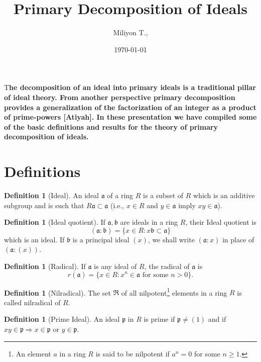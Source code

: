 \documentclass[	DIV=calc,paper=a4,fontsize=11pt]{scrartcl}	 					%
\title{Primary Decomposition of Ideals}					%
\author{Miliyon T., }											%
\date{\today}																				%
\theoremstyle{definition}
\newtheorem{defn}[thm]{Definition}
\theoremstyle{plain}
\theoremstyle{remark}
\newcommand{\initial}[1]{%
     \lettrine[lines=3,lhang=0.3,nindent=0em]{
     				\color{DarkGoldenrod}
     				{\textsf{#1}}}{}}
\begin{document}
\maketitle
\thispagestyle{fancy} 			%
\initial{T}\textbf{he decomposition of an ideal into primary ideals is a traditional pillar of ideal theory. From another perspective primary decomposition provides a generalization of the factorization of an integer as a product of prime-powers [Atiyah]. In these presentation we have compiled some of the basic definitions and results for the theory of primary decomposition of ideals.}

\section{Definitions}
\begin{defn}[Ideal]
An ideal $\mathfrak{a}$ of a ring $R$ is a subset of $R$ which is an additive subgroup and is such that $R\mathfrak{a} \subset \mathfrak{a}$ (i.e., $x\in R$ and $y\in \mathfrak{a}$ imply $xy\in \mathfrak{a}$).
\end{defn}
\begin{defn}[Ideal quotient]
If $\mathfrak{a}, \mathfrak{b}$ are ideals in a ring $R$, their Ideal quotient is
\[(\mathfrak{a}:\mathfrak{b}) = \{x\in R:x\mathfrak{b}\subset \mathfrak{a}\}\]
which is an ideal. If $\mathfrak{b}$ is a principal ideal $(x)$, we shall write $(\mathfrak{a} : x)$ in place of $(\mathfrak{a}:(x))$.
\end{defn}

\begin{defn}[Radical]
If $\mathfrak{a}$ is any ideal of $R$, the radical of $\mathfrak{a}$ is
\[r(\mathfrak{a}) = \{x\in R :x^n\in \mathfrak{a} \text{ for some } n>0\}.\]
\end{defn}

\begin{defn}[Nilradical]
The set $\mathfrak{R}$ of all nilpotent\footnote{An element $a$ in a ring $R$ is said to be nilpotent if $a^n=0$ for some $n\ge1$.} elements in a ring $R$ is called nilradical of $R$.
\end{defn}

\begin{defn}[Prime Ideal]
An ideal $\mathfrak{p}$ in $R$ is prime if $\mathfrak{p}\neq (1)$ and if $xy\in \mathfrak{p} \Rightarrow x\in \mathfrak{p}$ or $y\in \mathfrak{p}$.
\end{defn}
\end{document}
